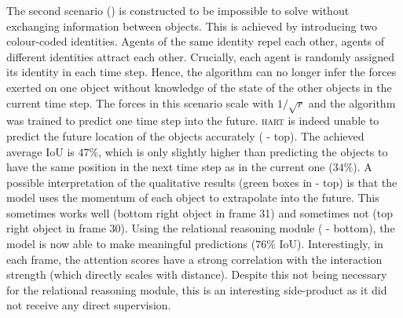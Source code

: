 The second scenario () is constructed to be impossible to solve without exchanging information between objects. This is achieved by introducing two colour-coded identities. Agents of the same identity repel each other, agents of different identities attract each other. Crucially, each agent is randomly assigned its identity in each time step. Hence, the algorithm can no longer infer the forces exerted on one object without knowledge of the state of the other objects in the current time step. The forces in this scenario scale with $1/\sqrt{r}$ and the algorithm was trained to predict one time step into the future. \textsc{hart} is indeed unable to predict the future location of the objects accurately ( - top). The achieved average IoU is $47\%$, which is only slightly higher than predicting the objects to have the same position in the next time step as in the current one ($34\%$). A possible interpretation of the qualitative results (green boxes in  - top) is that the model uses the momentum of each object to extrapolate into the future. This sometimes works well (bottom right object in frame 31) and sometimes not (top right object in frame 30). Using the relational reasoning module ( - bottom), the model is now able to make meaningful predictions ($76\%$ IoU). Interestingly, in each frame, the attention scores have a strong correlation with the interaction strength (which directly scales with distance). Despite this not being necessary for the relational reasoning module, this is an interesting side-product as it did not receive any direct supervision.

